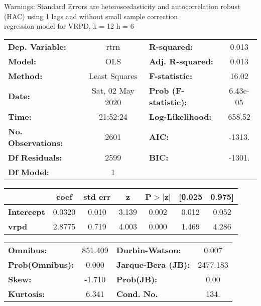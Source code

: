 Warnings: \newline
 [1] Standard Errors are heteroscedasticity and autocorrelation robust (HAC) using 1 lags and without small sample correction\\ 

regression model for VRPD, k = 12 h = 6\begin{center}
\begin{tabular}{lclc}
\toprule
\textbf{Dep. Variable:}    &       rtrn       & \textbf{  R-squared:         } &     0.013   \\
\textbf{Model:}            &       OLS        & \textbf{  Adj. R-squared:    } &     0.013   \\
\textbf{Method:}           &  Least Squares   & \textbf{  F-statistic:       } &     16.02   \\
\textbf{Date:}             & Sat, 02 May 2020 & \textbf{  Prob (F-statistic):} &  6.43e-05   \\
\textbf{Time:}             &     21:52:24     & \textbf{  Log-Likelihood:    } &    658.52   \\
\textbf{No. Observations:} &        2601      & \textbf{  AIC:               } &    -1313.   \\
\textbf{Df Residuals:}     &        2599      & \textbf{  BIC:               } &    -1301.   \\
\textbf{Df Model:}         &           1      & \textbf{                     } &             \\
\bottomrule
\end{tabular}
\begin{tabular}{lcccccc}
                   & \textbf{coef} & \textbf{std err} & \textbf{z} & \textbf{P$> |$z$|$} & \textbf{[0.025} & \textbf{0.975]}  \\
\midrule
\textbf{Intercept} &       0.0320  &        0.010     &     3.139  &         0.002        &        0.012    &        0.052     \\
\textbf{vrpd}      &       2.8775  &        0.719     &     4.003  &         0.000        &        1.469    &        4.286     \\
\bottomrule
\end{tabular}
\begin{tabular}{lclc}
\textbf{Omnibus:}       & 851.409 & \textbf{  Durbin-Watson:     } &    0.007  \\
\textbf{Prob(Omnibus):} &   0.000 & \textbf{  Jarque-Bera (JB):  } & 2477.183  \\
\textbf{Skew:}          &  -1.710 & \textbf{  Prob(JB):          } &     0.00  \\
\textbf{Kurtosis:}      &   6.341 & \textbf{  Cond. No.          } &     134.  \\
\bottomrule
\end{tabular}
\end{center}

